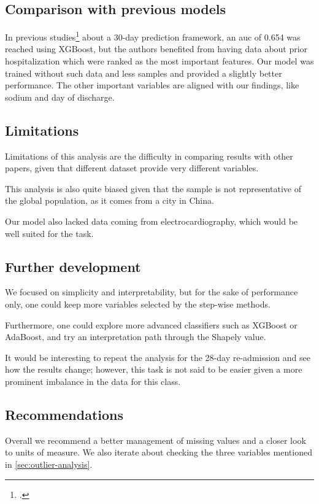 \subsection{Comparison with previous models}

In previous studies\footcite{Sharma2022Predicting} about a 30-day prediction framework, an \gls{auc} of 0.654 was reached using XGBoost, but the authors benefited from having data about prior hospitalization which were ranked as the most important features. Our model was trained without such data and less samples and provided a slightly better performance. The other important variables are aligned with our findings, like sodium and day of discharge.

\subsection{Limitations}

Limitations of this analysis are the difficulty in comparing results with other papers, given that different dataset provide very different variables.

This analysis is also quite biased given that the sample is not representative of the global population, as it comes from a city in China.

Our model also lacked data coming from electrocardiography, which would be well suited for the task.

\subsection{Further development}

We focused on simplicity and interpretability, but for the sake of performance only, one could keep more variables selected by the step-wise methods.

Furthermore, one could explore more advanced classifiers such as XGBoost or AdaBoost, and try an interpretation path through the Shapely value.

It would be interesting to repeat the analysis for the 28-day re-admission and see how the results change; however, this task is not said to be easier given a more prominent imbalance in the data for this class.

\subsection{Recommendations}

Overall we recommend a better management of missing values and a closer look to units of measure. We also iterate about checking the three variables mentioned in \autoref{sec:outlier-analysis}.
